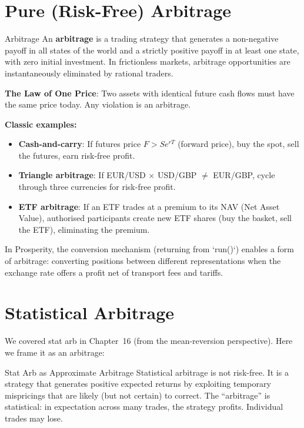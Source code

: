 \documentclass[12pt,a4paper,openany]{report}
\theoremstyle{definition}
\begin{document}
\section{Pure (Risk-Free) Arbitrage}

\begin{definitionbox}{Arbitrage}
An \textbf{arbitrage} is a trading strategy that generates a non-negative payoff in all states of the world and a strictly positive payoff in at least one state, with zero initial investment. In frictionless markets, arbitrage opportunities are instantaneously eliminated by rational traders.
\end{definitionbox}

\textbf{The Law of One Price}: Two assets with identical future cash flows must have the same price today. Any violation is an arbitrage.

\textbf{Classic examples:}
\begin{itemize}
  \item \textbf{Cash-and-carry}: If futures price $F > S e^{rT}$ (forward price), buy the spot, sell the futures, earn risk-free profit.
  \item \textbf{Triangle arbitrage}: If EUR/USD $\times$ USD/GBP $\neq$ EUR/GBP, cycle through three currencies for risk-free profit.
  \item \textbf{ETF arbitrage}: If an ETF trades at a premium to its NAV (Net Asset Value), authorised participants create new ETF shares (buy the basket, sell the ETF), eliminating the premium.
\end{itemize}

In Prosperity, the conversion mechanism (returning from `run()`) enables a form of arbitrage: converting positions between different representations when the exchange rate offers a profit net of transport fees and tariffs.

\section{Statistical Arbitrage}

We covered stat arb in Chapter~16 (from the mean-reversion perspective). Here we frame it as an arbitrage:

\begin{keyconceptbox}{Stat Arb as Approximate Arbitrage}
Statistical arbitrage is not risk-free. It is a strategy that generates positive expected returns by exploiting temporary mispricings that are likely (but not certain) to correct. The ``arbitrage'' is statistical: in expectation across many trades, the strategy profits. Individual trades may lose.
\end{keyconceptbox}
\end{document}
